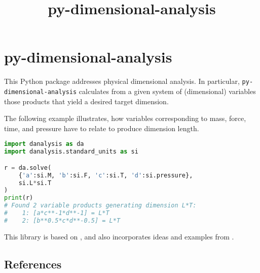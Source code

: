 \documentclass[11pt]{article}
\title{py-dimensional-analysis}
\date{}
\begin{document}
\maketitle

\section{py-dimensional-analysis}
This Python package addresses physical dimensional analysis. In particular, \texttt{py-dimensional-analysis} calculates from a given system of (dimensional) variables those products that yield a desired target dimension.


The following example illustrates, how variables corresponding to mass, force, time, and pressure have to relate to produce dimension length.

\begin{lstlisting}[language=Python]
import danalysis as da
import danalysis.standard_units as si

r = da.solve(
    {'a':si.M, 'b':si.F, 'c':si.T, 'd':si.pressure}, 
    si.L*si.T
)
print(r)
# Found 2 variable products generating dimension L*T:
#    1: [a*c**-1*d**-1] = L*T
#    2: [b**0.5*c*d**-0.5] = L*T
\end{lstlisting}

This library is based on \cite{szirtes2007applied}, and also incorporates ideas and examples from \cite{santiago2019first, sonin2001dimensional}.

\subsection{References}

\begingroup
\renewcommand{\section}[2]{}%

\endgroup
\end{document}
